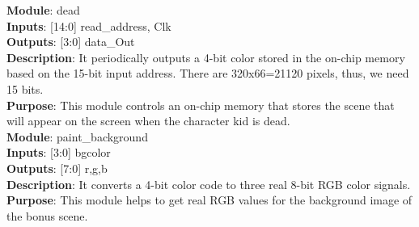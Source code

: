 \documentclass[12pt]{article}
\begin{document}
\textbf{Module}: dead \\
\textbf{Inputs}: [14:0] read\_address, Clk \\ 
\textbf{Outputs}: [3:0] data\_Out \\
\textbf{Description}: It periodically outputs a 4-bit color stored in the on-chip memory based on the 15-bit input address. There are 320x66=21120 pixels, thus, we need 15 bits. \\ 
\textbf{Purpose}: This module controls an on-chip memory that stores the scene that will appear on the screen when the character kid is dead. \\

\textbf{Module}: paint\_background \\ 
\textbf{Inputs}: [3:0] bgcolor \\ 
\textbf{Outputs}: [7:0] r,g,b \\
\textbf{Description}: It converts a 4-bit color code to three real 8-bit RGB color signals. \\ 
\textbf{Purpose}: This module helps to get real RGB values for the background image of the bonus scene. \\
\end{document}
